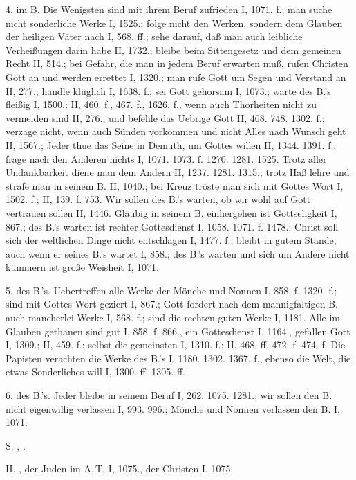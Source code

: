 4.  im B. Die Wenigsten sind mit ihrem Beruf zufrieden I, 1071. f.; man suche nicht sonderliche Werke I, 1525.; folge nicht den Werken, sondern dem Glauben der heiligen Väter nach I, 568. ff.; sehe darauf, daß man auch leibliche Verheißungen darin habe II, 1732.; bleibe beim Sittengesetz und dem gemeinen Recht II, 514.; bei Gefahr, die man in jedem Beruf erwarten muß, rufen Christen Gott an und werden errettet I, 1320.; man rufe Gott um Segen und Verstand an II, 277.; handle klüglich I, 1638. f.; sei Gott gehorsam I, 1073.; warte des B.’s fleißig I, 1500.; II, 460. f., 467. f., 1626. f., wenn auch Thorheiten nicht zu vermeiden sind II, 276., und befehle das Uebrige Gott II, 468. 748. 1302. f.; verzage nicht, wenn auch Sünden vorkommen und nicht Alles nach Wunsch geht II, 1567.; Jeder thue das Seine in Demuth, um Gottes willen II, 1344. 1391. f., frage nach den Anderen nichts I, 1071. 1073. f. 1270. 1281. 1525. Trotz aller Undankbarkeit diene man dem Andern II, 1237. 1281. 1315.; trotz Haß lehre und strafe man in seinem B. II, 1040.; bei Kreuz tröste man sich mit Gottes Wort I, 1502. f.; II, 139. f. 753. Wir sollen des B.’s warten, ob wir wohl auf Gott vertrauen sollen II, 1446. Gläubig in seinem B. einhergehen ist Gottseligkeit I, 867.; des B.’s warten ist rechter Gottesdienst I, 1058. 1071. f. 1478.; Christ soll sich der weltlichen Dinge nicht entschlagen I, 1477. f.; bleibt in gutem Stande, auch wenn er seines B.’s wartet I, 858.; des B.’s warten und sich um Andere nicht kümmern ist große Weisheit I, 1071.

5.  des B.’s. Uebertreffen alle Werke der Mönche und Nonnen I, 858. f. 1320. f.; sind mit Gottes Wort geziert I, 867.; Gott fordert nach dem mannigfaltigen B. auch mancherlei Werke I, 568. f.; sind die rechten guten Werke I, 1181. Alle im Glauben gethanen sind gut I, 858. f. 866., ein Gottesdienst I, 1164., gefallen Gott I, 1309.; II, 459. f.; selbst die gemeinsten I, 1310. f.; II, 468. ff. 472. f. 474. f. Die Papisten verachten die Werke des B.’s I, 1180. 1302. 1367. f., ebenso die Welt, die etwas Sonderliches will I, 1300. ff. 1305. ff.

6.  des B.’s. Jeder bleibe in seinem Beruf I, 262. 1075. 1281.; wir sollen den B. nicht eigenwillig verlassen I, 993. 996.; Mönche und Nonnen verlassen den B. I, 1071.

S. , .

II. , der Juden im A.\,T. I, 1075., der Christen I, 1075.

